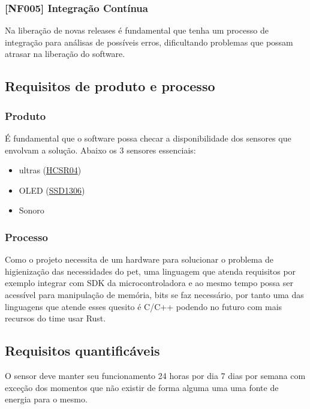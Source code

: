 \documentclass[12pt,a4paper]{article}
\begin{document}
\subsubsection{[NF005] Integração Contínua}
Na liberação de novas releases é fundamental que tenha um processo de
integração para análisas de possíveis erros, dificultando problemas que possam
atrasar na liberação do software.

\subsection{Requisitos de produto e processo}
\subsubsection{Produto}
É fundamental que o software possa checar a disponibilidade dos sensores que
envolvam a solução. Abaixo os 3 sensores essenciais:
\begin{itemize}
	\item \gls{ultras}
		(\href{https://cdn.sparkfun.com/datasheets/Sensors/Proximity/HCSR04.pdf}{HCSR04})
	\item \gls{OLED}
		(\href{https://cdn-shop.adafruit.com/datasheets/SSD1306.pdf}{SSD1306})
	\item Sonoro
\end{itemize}

\subsubsection{Processo}
Como o projeto necessita de um hardware para solucionar o problema de
higienização das necessidades do pet, uma linguagem que atenda requisitos
por exemplo integrar com SDK da \gls{microcontroladora} e ao mesmo tempo possa ser
acessível para manipulação de memória, bits se faz necessário, por tanto uma
das linguagens que atende esses quesito é C/C++ podendo no futuro com mais
recursos do time usar Rust.

\subsection{Requisitos quantificáveis}
O sensor deve manter seu funcionamento 24 horas por dia 7 dias por semana com 
exceção dos momentos que não existir de forma alguma uma uma fonte de energia 
para o mesmo.



\nocite{sommerville1997requirements}
\nocite{pressman2005software}
\nocite{project2000guide}
\nocite{de2003engenharia}
\nocite{wiki:Requisito_funcional}
\nocite{wiki:Sistema_de_controle_de_versoes}
\nocite{wiki:Continuous_integration}
\end{document}
